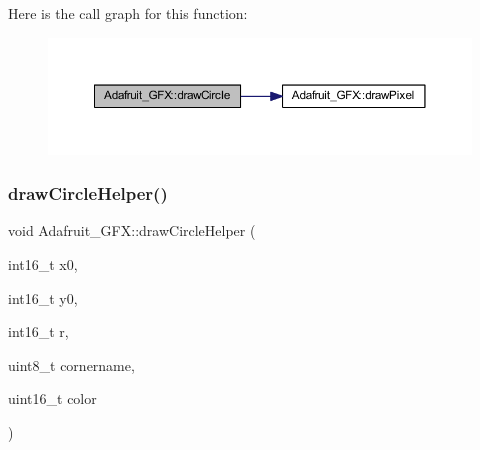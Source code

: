 Here is the call graph for this function\+:\nopagebreak
\begin{figure}[H]
\begin{center}
\leavevmode
\includegraphics[width=350pt]{class_adafruit___g_f_x_a648d2d6765e488b4556e802167d885fb_cgraph}
\end{center}
\end{figure}
\mbox{\label{class_adafruit___g_f_x_a3f2dd7b698e7b95ebf9fecf992ff802e}} 
\subsubsection{\texorpdfstring{draw\+Circle\+Helper()}{drawCircleHelper()}}
{\footnotesize\ttfamily void Adafruit\+\_\+\+G\+F\+X\+::draw\+Circle\+Helper (\begin{DoxyParamCaption}\item[{int16\+\_\+t}]{x0,  }\item[{int16\+\_\+t}]{y0,  }\item[{int16\+\_\+t}]{r,  }\item[{uint8\+\_\+t}]{cornername,  }\item[{uint16\+\_\+t}]{color }\end{DoxyParamCaption})}

